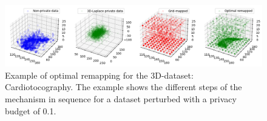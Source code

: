\begin{figure}[H]
    \includegraphics[width=1.1\textwidth]{TheorethicalFramework/ND-Laplace/Images/optimal-remapping-example.png}
    \caption{Example of optimal remapping for the 3D-dataset: Cardiotocography. The example shows the different steps of the mechanism in sequence for a dataset perturbed with a privacy budget of 0.1.}
\end{figure}

